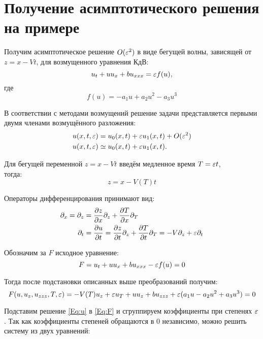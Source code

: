 \chapter*{Получение асимптотического решения на примере}

Получим асимптотическое решение $O(\varepsilon^2)$
в виде бегущей волны,
зависящей от $z=x-Vt$,
для возмущенного уравнения КдВ:
\begin{equation*}
    u_t + u u_x + b u_{xxx} = \varepsilon f(u),
\end{equation*}
где
\begin{equation*}
    f(u) = - a_1 u + a_2 u^2 - a_3 u^3
\end{equation*}

В соответствии с методами возмущений
решение задачи представляется
первыми двумя членами возмущённого разложения:
\begin{align}
    u(x, t, \varepsilon) & = u_0(x, t) + \varepsilon u_1(x, t) +
    O(\varepsilon^2) \nonumber \\
    u(x, t, \varepsilon) & \simeq u_0(x, t) + \varepsilon u_1(x, t). \label{Eq:u}
\end{align}

Для бегущей переменной $z = x - V t$
введём медленное время $T = \varepsilon t$,\\
тогда:
\begin{equation*}
    z = x - V(T) t
\end{equation*}

Операторы дифференцирования принимают вид:
\begin{align*}
    \partial_x = \partial_z & =  
    \pdv{z}{x} \partial_z + \pdv{T}{x} \partial_T \\
    \partial_t & = \pdv{u}{t} =
    \pdv{z}{t} \partial_z + \pdv{T}{t} \partial_T =
    -V \partial_z + \varepsilon \partial_t
\end{align*}

Обозначим за $F$ исходное уравнение:
\begin{equation} \label{Eq:F}
    F = u_t + u u_x + b u_{xxx} - \varepsilon f(u) = 0 
\end{equation}

Тогда после подстановки описанных выше преобразований получим:
\begin{equation*}
    F(u, u_z, u_{zzz}, T, \varepsilon) =
    -V(T) u_z + \varepsilon u_T + u u_z + b u_{zzz} +
    \varepsilon (a_1 u - a_2 u^2 + a_3 u^3) = 0
\end{equation*}

Подставим решение \eqref{Eq:u} в \eqref{Eq:F}
и сгруппируем коэффициенты при степенях $\varepsilon$.
Так как коэффициенты степеней обращаются в 0 независимо,
можно решить систему из двух уравнений:

